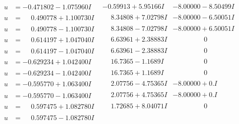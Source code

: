 \documentclass[1p]{elsarticle_modified}
\theoremstyle{definition}
\begin{document}
$$\begin{array}{c|c|c}
\begin{aligned}
u &= -0.471802 - 1.075960 I\end{aligned}
 & -0.59913 + 5.95166 I & -8.00000 - 8.50499 I \\ \hline\begin{aligned}
u &= \phantom{-}0.490778 + 1.100730 I\end{aligned}
 & \phantom{-}8.34808 + 7.02798 I & -8.00000 - 6.50051 I \\ \hline\begin{aligned}
u &= \phantom{-}0.490778 - 1.100730 I\end{aligned}
 & \phantom{-}8.34808 - 7.02798 I & -8.00000 + 6.50051 I \\ \hline\begin{aligned}
u &= \phantom{-}0.614197 + 1.047040 I\end{aligned}
 & \phantom{-}6.63961 + 2.38883 I & \phantom{-0.000000 } 0 \\ \hline\begin{aligned}
u &= \phantom{-}0.614197 - 1.047040 I\end{aligned}
 & \phantom{-}6.63961 - 2.38883 I & \phantom{-0.000000 } 0 \\ \hline\begin{aligned}
u &= -0.629234 + 1.042400 I\end{aligned}
 & \phantom{-}16.7365 - 1.1689 I & \phantom{-0.000000 } 0 \\ \hline\begin{aligned}
u &= -0.629234 - 1.042400 I\end{aligned}
 & \phantom{-}16.7365 + 1.1689 I & \phantom{-0.000000 } 0 \\ \hline\begin{aligned}
u &= -0.595770 + 1.063400 I\end{aligned}
 & \phantom{-}2.07756 - 4.75365 I & -8.00000 + 0. I\phantom{ +0.000000I} \\ \hline\begin{aligned}
u &= -0.595770 - 1.063400 I\end{aligned}
 & \phantom{-}2.07756 + 4.75365 I & -8.00000 + 0. I\phantom{ +0.000000I} \\ \hline\begin{aligned}
u &= \phantom{-}0.597475 + 1.082780 I\end{aligned}
 & \phantom{-}1.72685 + 8.04071 I & \phantom{-0.000000 } 0 \\ \hline\begin{aligned}
u &= \phantom{-}0.597475 - 1.082780 I\end{aligned}

\end{array}$$
\end{document}
